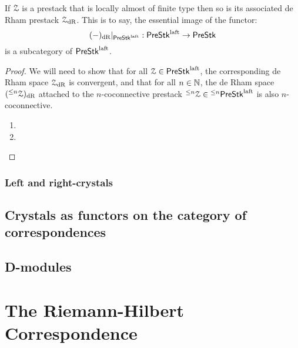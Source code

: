                 \begin{proposition} \label{prop: laft_de_rham_spaces}
                    If $\mathcal{Z}$ is a prestack that is locally almost of finite type then so is its associated de Rham prestack $\mathcal{Z}_{\mathrm{dR}}$. This is to say, the essential image of the functor:
                        $$(-)_{\mathrm{dR}}|_{\mathsf{Pre}\mathsf{Stk}^{\mathrm{laft}}}: \mathsf{Pre}\mathsf{Stk}^{\mathrm{laft}} \to \mathsf{Pre}\mathsf{Stk}$$
                    is a subcategory of $\mathsf{Pre}\mathsf{Stk}^{\mathrm{laft}}$.
                \end{proposition}
                    \begin{proof}
                        We will need to show that for all $\mathcal{Z} \in \mathsf{Pre}\mathsf{Stk}^{\mathrm{laft}}$, the corresponding de Rham space $\mathcal{Z}_{\mathrm{dR}}$ is convergent, and that for all $n \in \mathbb{N}$, the de Rham space $({}^{\leq n}\mathcal{Z})_{\mathrm{dR}}$ attached to the $n$-coconnective prestack ${}^{\leq n}\mathcal{Z} \in {}^{\leq n}\mathsf{Pre}\mathsf{Stk}^{\mathrm{laft}}$ is also $n$-coconnective.
                            \begin{enumerate}
                                \item 
                                \item 
                            \end{enumerate}
                    \end{proof}
                
                \begin{remark} \label{remark: universal_property_of_de_rham_spaces}
                    
                \end{remark}
                    
            \subsubsection{Left and right-crystals}
        
        \subsection{Crystals as functors on the category of correspondences}
        
        \subsection{D-modules}
        
    \section{The Riemann-Hilbert Correspondence}
    
